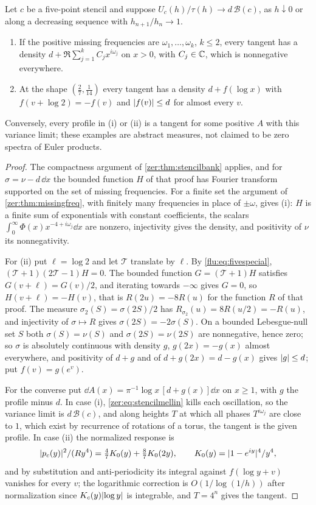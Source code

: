 \begin{theorem}\label{flu:thm:fivetangents}
Let $c$ be a five-point stencil and suppose $U_c(h)/\tau(h)\to d\,\mathcal B(c)$, as $h\downarrow0$ or along a
decreasing sequence with $h_{n+1}/h_n\to1$.
\begin{enumerate}[label=\textup{(\roman*)}]
\item If the positive missing frequencies are $\omega_1,\dots,\omega_k$, $k\le2$, every tangent has a density
$d+\Re\sum_{j=1}^kC_jx^{i\omega_j}$ on $x>0$, with $C_j\in\mathbb{C}$, which is nonnegative everywhere.
\item At the shape $(\tfrac27,\tfrac1{14})$ every tangent has a density $d+f(\log x)$ with
$f(v+\log2)=-f(v)$ and $\lvert f(v)\rvert\le d$ for almost every $v$.
\end{enumerate}
Conversely, every profile in (i) or (ii) is a tangent for some positive $A$ with this variance limit; these
examples are abstract measures, not claimed to be zero spectra of Euler products.
\end{theorem}
\begin{proof}
The compactness argument of \cref{zer:thm:stencilbank} applies, and for $\sigma=\nu-d\,\dd x$ the bounded
function $H$ of that proof has Fourier transform supported on the set of missing frequencies. For a finite set
the argument of \cref{zer:thm:missingfreq}, with finitely many frequencies in place of $\pm\omega$, gives (i):
$H$ is a finite sum of exponentials with constant coefficients, the scalars $\int_0^\infty\Phi(x)x^{-4+i\omega_j}\dd x$
are nonzero, injectivity gives the density, and positivity of $\nu$ its nonnegativity.

For (ii) put $\ell=\log2$ and let $\mathcal T$ translate by $\ell$. By \eqref{flu:eq:fivespecial},
$(\mathcal T+1)(2\mathcal T-1)H=0$. The bounded function $G=(\mathcal T+1)H$ satisfies $G(v+\ell)=G(v)/2$, and
iterating towards $-\infty$ gives $G=0$, so $H(v+\ell)=-H(v)$, that is $R(2u)=-8R(u)$ for the function $R$ of that
proof. The measure $\sigma_2(S)=\sigma(2S)/2$ has $R_{\sigma_2}(u)=8R(u/2)=-R(u)$, and injectivity of $\sigma\mapsto R$
gives $\sigma(2S)=-2\sigma(S)$. On a bounded Lebesgue-null set $S$ both $\sigma(S)=\nu(S)$ and $\sigma(2S)=\nu(2S)$ are
nonnegative, hence zero; so $\sigma$ is absolutely continuous with density $g$, $g(2x)=-g(x)$ almost everywhere,
and positivity of $d+g$ and of $d+g(2x)=d-g(x)$ gives $\lvert g\rvert\le d$; put $f(v)=g(e^v)$.

For the converse put $\dd A(x)=\pi^{-1}\log x\,[d+g(x)]\dd x$ on $x\ge1$, with $g$ the profile minus $d$. In case (i),
\eqref{zer:eq:stencilmellin} kills each oscillation, so the variance limit is $d\,\mathcal B(c)$, and along heights
$T$ at which all phases $T^{i\omega_j}$ are close to $1$, which exist by recurrence of rotations of a torus, the
tangent is the given profile. In case (ii) the normalized response is
\[
 \lvert p_c(y)\rvert^2/(Ry^4)=\tfrac47K_0(y)+\tfrac87K_0(2y),\qquad K_0(y)=\lvert1-e^{iy}\rvert^4/y^4,
\]
and by substitution and anti-periodicity its integral against $f(\log y+v)$ vanishes for every $v$; the
logarithmic correction is $O(1/\log(1/h))$ after normalization since $K_c(y)\lvert\log y\rvert$ is integrable, and
$T=4^n$ gives the tangent.
\end{proof}

